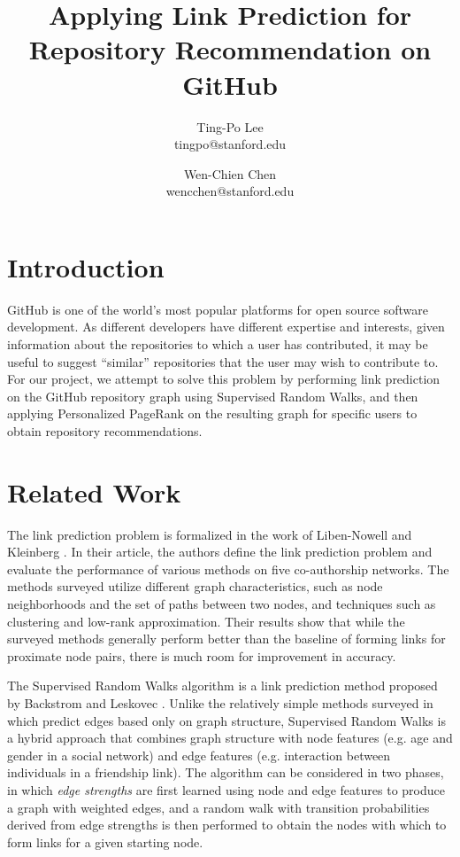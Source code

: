 \documentclass[10pt]{article}
\title{\vspace{-2em} Applying Link Prediction for Repository Recommendation on GitHub}
\author{
Ting-Po Lee \\
tingpo@stanford.edu
\and
Wen-Chien Chen \\
wencchen@stanford.edu
}
\date{}
\begin{document}
\maketitle

\begin{multicols}{2}

\section{Introduction}

GitHub is one of the world’s most popular platforms for open source software development. As different developers have different expertise and interests, given information about the repositories to which a user has contributed, it may be useful to suggest “similar” repositories that the user may wish to contribute to. For our project, we attempt to solve this problem by performing link prediction on the GitHub repository graph using Supervised Random Walks, and then applying Personalized PageRank on the resulting graph for specific users to obtain repository recommendations.

\section{Related Work}

The link prediction problem is formalized in the work of Liben-Nowell and Kleinberg \cite{kleinberg}. In their article, the authors define the link prediction problem and evaluate the performance of various methods on five co-authorship networks. The methods surveyed utilize different graph characteristics, such as node neighborhoods and the set of paths between two nodes, and techniques such as clustering and low-rank approximation. Their results show that while the surveyed methods generally perform better than the baseline of forming links for proximate node pairs, there is much room for improvement in accuracy.

The Supervised Random Walks algorithm is a link prediction method proposed by Backstrom and Leskovec \cite{backstrom}. Unlike the relatively simple methods surveyed in \cite{kleinberg} which predict edges based only on graph structure, Supervised Random Walks is a hybrid approach that combines graph structure with node features (e.g. age and gender in a social network) and edge features (e.g. interaction between individuals in a friendship link). The algorithm can be considered in two phases, in which \textit{edge strengths} are first learned using node and edge features to produce a graph with weighted edges, and a random walk with transition probabilities derived from edge strengths is then performed to obtain the nodes with which to form links for a given starting node.


\end{multicols}
\end{document}
